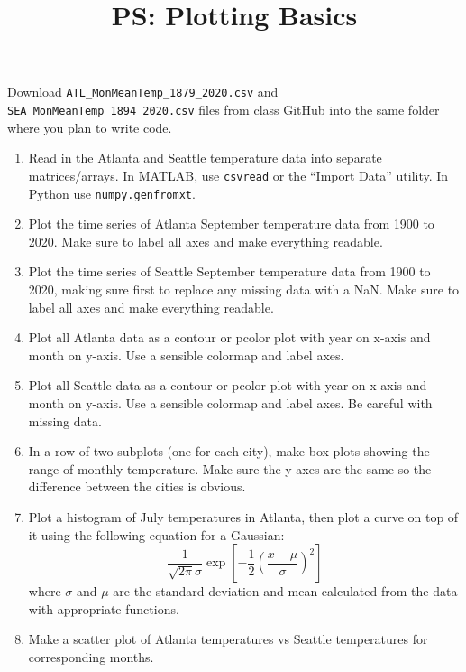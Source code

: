 \documentclass{article}
\title{\vspace{-1in} PS: Plotting Basics}
\date{}
\newcommand{\be}{\begin{enumerate}}
\newcommand{\ee}{\end{enumerate}}
\begin{document}
\maketitle

Download \texttt{ATL\_MonMeanTemp\_1879\_2020.csv} and \texttt{SEA\_MonMeanTemp\_1894\_2020.csv} files from class GitHub into the same folder where you plan to write code.

\be
\item Read in the Atlanta and Seattle temperature data into separate matrices/arrays. In MATLAB, use \texttt{csvread} or the ``Import Data'' utility. In Python use \texttt{numpy.genfromxt}.

\item Plot the time series of Atlanta September temperature data from 1900 to 2020. Make sure to label all axes and make everything readable.

\item Plot the time series of Seattle September temperature data from 1900 to 2020, making sure first to replace any missing data with a NaN. Make sure to label all axes and make everything readable. 

\item Plot all Atlanta data as a contour or pcolor plot with year on x-axis and month on y-axis. Use a sensible colormap and label axes.

\item Plot all Seattle data as a contour or pcolor plot with year on x-axis and month on y-axis. Use a sensible colormap and label axes. Be careful with missing data.

\item In a row of two subplots (one for each city), make box plots showing the range of monthly temperature. Make sure the y-axes are the same so the difference between the cities is obvious.

\item Plot a histogram of July temperatures in Atlanta, then plot a curve on top of it using the following equation for a Gaussian:
\begin{equation}
\frac{1}{\sqrt{2 \pi} \sigma} \exp \left[-\frac{1}{2} \left(\frac{x-\mu}{\sigma} \right)^2 \right]
\end{equation}
where $\sigma$ and $\mu$ are the standard deviation and mean calculated from the data with appropriate functions.

\item Make a scatter plot of Atlanta temperatures vs Seattle temperatures for corresponding months.

\ee
\end{document}
